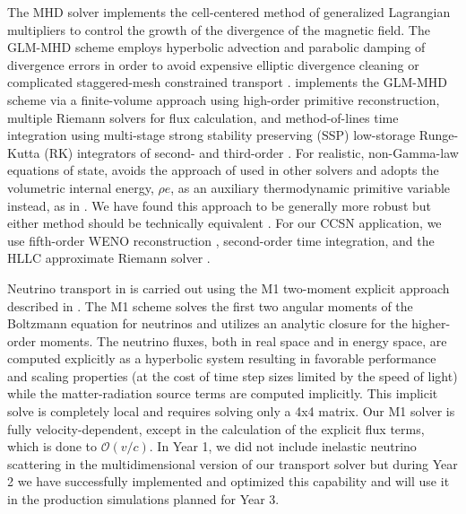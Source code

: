 \documentclass[12pt]{article}
\begin{document}
The \spark MHD solver \citep{couch:2019a} implements the cell-centered method of generalized Lagrangian multipliers \citep[GLM;][]{Dedner:2002, Mignone:2010} to control the growth of the divergence of the magnetic field. 
The GLM-MHD scheme employs hyperbolic advection and parabolic damping of divergence errors in order to avoid expensive elliptic divergence cleaning \citep[e.g.,][]{Jiang:1999} or complicated staggered-mesh constrained transport \citep[e.g.,][]{Gardiner:2005, Lee:2009a, Lee:2013}.
\spark implements the GLM-MHD scheme via a finite-volume approach using high-order primitive reconstruction, multiple Riemann solvers for flux calculation, and method-of-lines time integration using multi-stage strong stability preserving (SSP) low-storage Runge-Kutta (RK) integrators of second- and third-order \citep[e.g.,][]{Gottlieb:1998}.
For realistic, non-Gamma-law equations of state, \spark avoids the approach of \citet{Colella:1985} used in other \flash solvers and adopts the volumetric internal energy, $\rho e$, as an auxiliary thermodynamic primitive variable instead, as in \citet{Almgren:2010}.
We have found this approach to be generally more robust but either method should be technically equivalent \citep[e.g.,][]{Zingale:2015}.
For our CCSN application, we use fifth-order WENO reconstruction \citep{Borges:2008}, second-order time integration, and the HLLC approximate Riemann solver \citep{toro:2009}.



Neutrino transport in \sparkmone is carried out using the M1 two-moment explicit approach described in \citet{oconnor:2015, oconnor:2018, oconnor:2018b}. 
The M1 scheme solves the first two angular moments of the Boltzmann equation for neutrinos and utilizes an analytic closure for the higher-order moments.
The neutrino fluxes, both in real space and in energy space, are computed explicitly as a hyperbolic system resulting in favorable performance and scaling properties (at the cost of time step sizes limited by the speed of light) while the matter-radiation source terms are computed implicitly.
This implicit solve is completely local and requires solving only a 4x4 matrix.
Our M1 solver is fully velocity-dependent, except in the calculation of the explicit flux terms, which is done to $\mathcal{O}(v/c)$.
In Year 1, we did not include inelastic neutrino scattering in the multidimensional version of our transport solver but during Year 2 we have successfully implemented and optimized this capability and will use it in the production simulations planned for Year 3.
\end{document}
